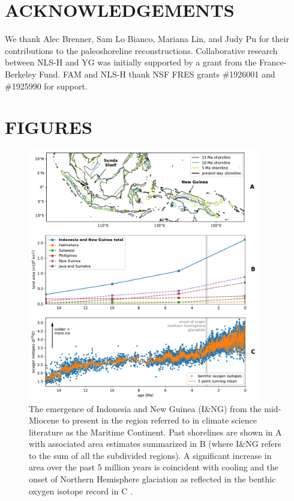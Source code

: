 \documentclass[11pt,letterpaper]{article}
\begin{document}
\section*{ACKNOWLEDGEMENTS \label{sec:ACKNOWLEDGEMENTS}}

We thank Alec Brenner, Sam Lo Bianco, Mariana Lin, and Judy Pu for their contributions to the paleoshoreline reconstructions. Collaborative research between NLS-H and YG was initially supported by a grant from the France-Berkeley Fund. FAM and NLS-H thank NSF FRES grants \#1926001 and \#1925990 for support. 

\clearpage
\newpage

\section*{FIGURES}

\begin{figure}[h!]
    \centering
    \includegraphics[width=0.9\textwidth]{Figures/shoreline_growth.pdf}
    \caption{The emergence of Indonesia and New Guinea (I\&NG) from the mid-Miocene to present in the region referred to in climate science literature as the Maritime Continent. Past shorelines are shown in A with associated area estimates summarized in B (where I\&NG refers to the sum of all the subdivided regions). A significant increase in area over the past 5 million years is coincident with cooling and the onset of Northern Hemisphere glaciation as reflected in the benthic oxygen isotope record in C \cite{Zachos2008a}.}
    \label{fig:shoreline_growth}
\end{figure}
\end{document}
